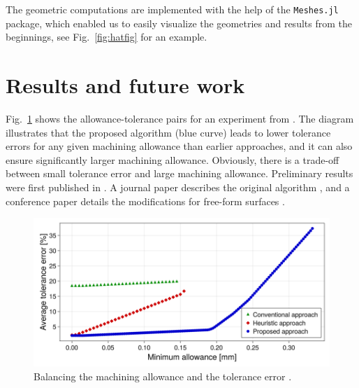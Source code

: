 \documentclass{juliacon}
\begin{document}
The geometric computations are implemented with the help of the \texttt{Meshes.jl} package, which enabled us to easily visualize the geometries and results from the beginnings, see Fig.~\ref{fig:hatfig} for an example.

\section{Results and future work} %
\label{sec:results}

Fig.~\ref{fig:pareto} shows the allowance-tolerance pairs for an experiment from \cite{cserteg:2023_Annals}.
The diagram illustrates that the proposed algorithm (blue curve) leads to lower tolerance errors for any given machining allowance than earlier approaches, and it can also ensure significantly larger machining allowance.
Obviously, there is a trade-off between small tolerance error and large machining allowance.
Preliminary results were first published in \cite{cserteg:2023_DigitalTwinAssisted}.
A journal paper describes the original algorithm \cite{cserteg:2023_Annals}, and a conference paper details the modifications for free-form surfaces \cite{cserteg:2023_CMS}.

\begin{figure}[b]
	\centerline{\includegraphics[width=0.9\columnwidth]{pareto-new-label.png}}
	\caption{Balancing the machining allowance and the tolerance error \cite{cserteg:2023_Annals}.}
	\label{fig:pareto}
\end{figure}
\end{document}
